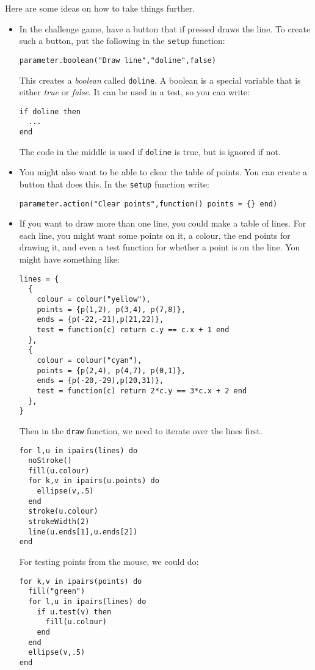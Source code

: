 \documentclass[
  xhtml,%
  use filename%
]{internet}
\begin{document}
Here are some ideas on how to take things further.

\begin{itemize}
\item In the challenge game, have a button that if pressed draws the line.
To create such a button, put the following in the \verb+setup+ function:

\begin{verbatim}
parameter.boolean("Draw line","doline",false)
\end{verbatim}

This creates a \emph{boolean} called \verb+doline+.
A boolean is a special variable that is either \emph{true} or \emph{false}.
It can be used in a test, so you can write:

\begin{verbatim}
if doline then
  ...
end
\end{verbatim}

The code in the middle is used if \verb+doline+ is true, but is ignored if not.

\item You might also want to be able to clear the table of points.
You can create a button that does this.
In the \verb+setup+ function write:

\begin{verbatim}
parameter.action("Clear points",function() points = {} end) 
\end{verbatim}

\item If you want to draw more than one line, you could make a table of lines.
For each line, you might want some points on it, a colour, the end points for drawing it, and even a test function for whether a point is on the line.
You might have something like:

\begin{verbatim}
lines = {
  {
    colour = colour("yellow"),
    points = {p(1,2), p(3,4), p(7,8)},
    ends = {p(-22,-21),p(21,22)},
    test = function(c) return c.y == c.x + 1 end
  },
  {
    colour = colour("cyan"),
    points = {p(2,4), p(4,7), p(0,1)},
    ends = {p(-20,-29),p(20,31)},
    test = function(c) return 2*c.y == 3*c.x + 2 end
  },
}
\end{verbatim}

Then in the \verb+draw+ function, we need to iterate over the lines first.

\begin{verbatim}
for l,u in ipairs(lines) do
  noStroke()
  fill(u.colour)
  for k,v in ipairs(u.points) do
    ellipse(v,.5)
  end
  stroke(u.colour)
  strokeWidth(2)
  line(u.ends[1],u.ends[2])
end
\end{verbatim}

For testing points from the mouse, we could do:

\begin{verbatim}
for k,v in ipairs(points) do
  fill("green")
  for l,u in ipairs(lines) do
    if u.test(v) then
      fill(u.colour)
    end
  end
  ellipse(v,.5)
end
\end{verbatim}
\end{itemize}
\end{document}
